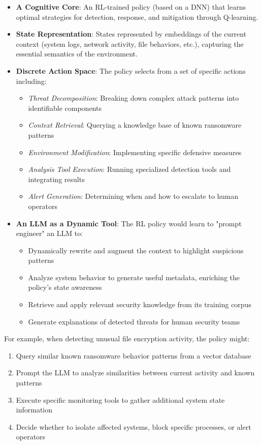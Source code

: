 \documentclass[11pt]{article}
\begin{document}
\begin{itemize}
    \item \textbf{A Cognitive Core}: An RL-trained policy (based on a DNN) that learns optimal strategies for detection, response, and mitigation through Q-learning.
    \item \textbf{State Representation}: States represented by embeddings of the current context (system logs, network activity, file behaviors, etc.), capturing the essential semantics of the environment.
    \item \textbf{Discrete Action Space}: The policy selects from a set of specific actions including:
        \begin{itemize}
            \item \emph{Threat Decomposition}: Breaking down complex attack patterns into identifiable components
            \item \emph{Context Retrieval}: Querying a knowledge base of known ransomware patterns
            \item \emph{Environment Modification}: Implementing specific defensive measures
            \item \emph{Analysis Tool Execution}: Running specialized detection tools and integrating results
            \item \emph{Alert Generation}: Determining when and how to escalate to human operators
        \end{itemize}
    \item \textbf{An LLM as a Dynamic Tool}: The RL policy would learn to "prompt engineer" an LLM to:
        \begin{itemize}
            \item Dynamically rewrite and augment the context to highlight suspicious patterns
            \item Analyze system behavior to generate useful metadata, enriching the policy's state awareness
            \item Retrieve and apply relevant security knowledge from its training corpus
            \item Generate explanations of detected threats for human security teams
        \end{itemize}
\end{itemize}

For example, when detecting unusual file encryption activity, the policy might:
\begin{enumerate}
    \item Query similar known ransomware behavior patterns from a vector database
    \item Prompt the LLM to analyze similarities between current activity and known patterns
    \item Execute specific monitoring tools to gather additional system state information
    \item Decide whether to isolate affected systems, block specific processes, or alert operators
\end{enumerate}
\end{document}
